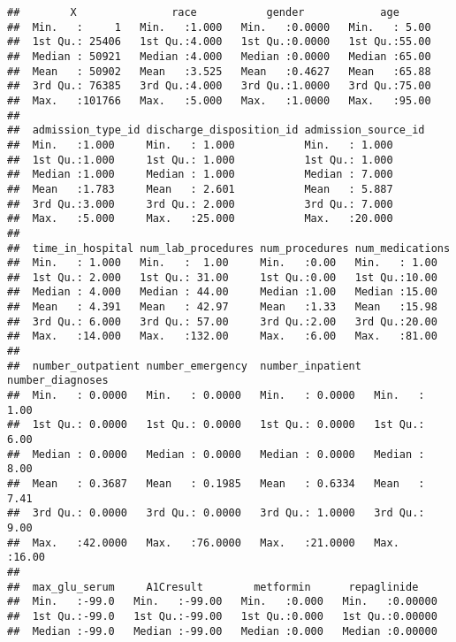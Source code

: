 \documentclass[11pt,]{article}
\begin{document}
\begin{verbatim}
##        X               race           gender            age       
##  Min.   :     1   Min.   :1.000   Min.   :0.0000   Min.   : 5.00  
##  1st Qu.: 25406   1st Qu.:4.000   1st Qu.:0.0000   1st Qu.:55.00  
##  Median : 50921   Median :4.000   Median :0.0000   Median :65.00  
##  Mean   : 50902   Mean   :3.525   Mean   :0.4627   Mean   :65.88  
##  3rd Qu.: 76385   3rd Qu.:4.000   3rd Qu.:1.0000   3rd Qu.:75.00  
##  Max.   :101766   Max.   :5.000   Max.   :1.0000   Max.   :95.00  
##                                                                   
##  admission_type_id discharge_disposition_id admission_source_id
##  Min.   :1.000     Min.   : 1.000           Min.   : 1.000     
##  1st Qu.:1.000     1st Qu.: 1.000           1st Qu.: 1.000     
##  Median :1.000     Median : 1.000           Median : 7.000     
##  Mean   :1.783     Mean   : 2.601           Mean   : 5.887     
##  3rd Qu.:3.000     3rd Qu.: 2.000           3rd Qu.: 7.000     
##  Max.   :5.000     Max.   :25.000           Max.   :20.000     
##                                                                
##  time_in_hospital num_lab_procedures num_procedures num_medications
##  Min.   : 1.000   Min.   :  1.00     Min.   :0.00   Min.   : 1.00  
##  1st Qu.: 2.000   1st Qu.: 31.00     1st Qu.:0.00   1st Qu.:10.00  
##  Median : 4.000   Median : 44.00     Median :1.00   Median :15.00  
##  Mean   : 4.391   Mean   : 42.97     Mean   :1.33   Mean   :15.98  
##  3rd Qu.: 6.000   3rd Qu.: 57.00     3rd Qu.:2.00   3rd Qu.:20.00  
##  Max.   :14.000   Max.   :132.00     Max.   :6.00   Max.   :81.00  
##                                                                    
##  number_outpatient number_emergency  number_inpatient  number_diagnoses
##  Min.   : 0.0000   Min.   : 0.0000   Min.   : 0.0000   Min.   : 1.00   
##  1st Qu.: 0.0000   1st Qu.: 0.0000   1st Qu.: 0.0000   1st Qu.: 6.00   
##  Median : 0.0000   Median : 0.0000   Median : 0.0000   Median : 8.00   
##  Mean   : 0.3687   Mean   : 0.1985   Mean   : 0.6334   Mean   : 7.41   
##  3rd Qu.: 0.0000   3rd Qu.: 0.0000   3rd Qu.: 1.0000   3rd Qu.: 9.00   
##  Max.   :42.0000   Max.   :76.0000   Max.   :21.0000   Max.   :16.00   
##                                                                        
##  max_glu_serum     A1Cresult        metformin      repaglinide     
##  Min.   :-99.0   Min.   :-99.00   Min.   :0.000   Min.   :0.00000  
##  1st Qu.:-99.0   1st Qu.:-99.00   1st Qu.:0.000   1st Qu.:0.00000  
##  Median :-99.0   Median :-99.00   Median :0.000   Median :0.00000  

\end{verbatim}
\end{document}
